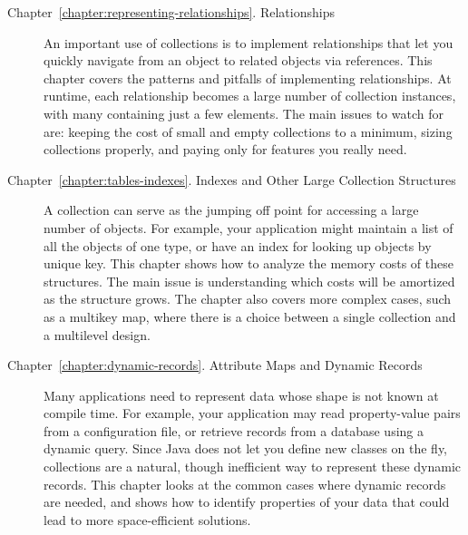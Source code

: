 \begin{description}
\item[Chapter~\ref{chapter:representing-relationships}.
Relationships] An important use of collections is to implement
relationships that let you quickly navigate from an object to related objects
via references. This chapter covers the patterns and pitfalls of
implementing relationships. At runtime, each relationship becomes a
large number of collection instances, with many containing just a few elements.
The main issues to watch for
are: keeping the cost of small and empty collections to a minimum, sizing
collections properly, and paying only for features you really need.

\item[Chapter~\ref{chapter:tables-indexes}. Indexes and Other Large Collection
Structures] A collection can serve as the jumping off
point for accessing a large number of objects. For example, your application
might maintain a list of all the objects of one type, or have an index for
looking up objects by unique key. This chapter shows how to analyze the memory
costs of these structures. The main
issue is understanding which costs will be amortized as the structure grows. The
chapter also covers more complex cases, such as a multikey map, where there is a
choice between a single collection and a multilevel design.

\item[Chapter~\ref{chapter:dynamic-records}. Attribute Maps and Dynamic
Records] Many applications need to represent data whose shape is not
known at compile time. For example, your application may read property-value
pairs from a configuration file, or retrieve records from a database
using a dynamic query. Since Java does not let you define new classes on the
fly, collections are a natural, though inefficient way to represent
these dynamic records. This chapter looks at the common cases where dynamic records
are needed, and shows how to identify properties of your data that could lead to
more space-efficient solutions.


\end{description}

